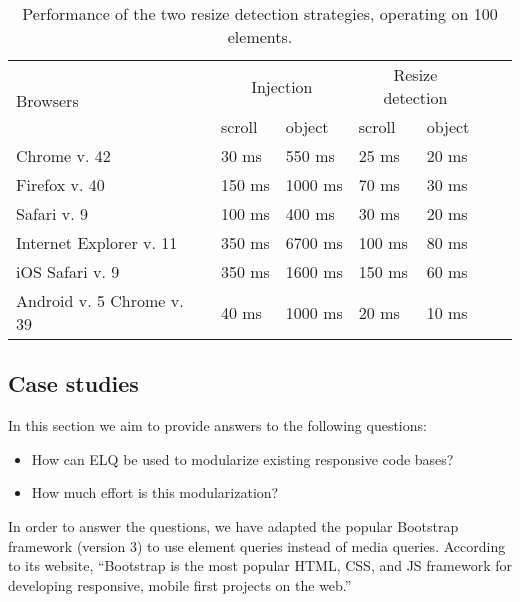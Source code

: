 \documentclass[]{llncs}
\newcommand{\elq}{ELQ}
\begin{document}
    \begin{table}[ht]\center
      \tiny
      \begin{tabular}[t]{ l l l l l l l }
        \multirow{2}{*}{Browsers} & \multicolumn{2}{c}{Injection} & \multicolumn{2}{c}{Resize detection} \\
        & scroll & object & scroll & object \\
        \hline
        Chrome v. 42                & 30 ms   & 550 ms    & 25 ms    & 20 ms  \\
        Firefox v. 40               & 150 ms  & 1000 ms   & 70 ms    & 30 ms  \\
        Safari v. 9                 & 100 ms  & 400 ms    & 30 ms    & 20 ms  \\
        Internet Explorer v. 11     & 350 ms  & 6700 ms   & 100 ms   & 80 ms  \\
        iOS Safari v. 9             & 350 ms  & 1600 ms   & 150 ms   & 60 ms  \\
        Android v. 5 Chrome v. 39   & 40 ms   & 1000 ms  & 20 ms     & 10 ms  \\
      \end{tabular}
      \vspace{.5cm}
      \caption{Performance of the two resize detection strategies, operating on 100 elements.}
      \label{table:erd-layout-engines}
    \end{table}
    \vspace{-1cm}
  \subsection{Case studies}
    In this section we aim to provide answers to the following questions:
    \begin{itemize}
      \item How can \elq{} be used to modularize existing responsive code bases?
      \item How much effort is this modularization?
    \end{itemize}

    \noindent
    In order to answer the questions, we have adapted the popular Bootstrap framework (version 3) to use element queries instead of media queries.
    According to its website, ``Bootstrap is the most popular HTML, CSS, and JS framework for developing responsive, mobile first projects on the web.''~\cite{bootstrap}
\end{document}

